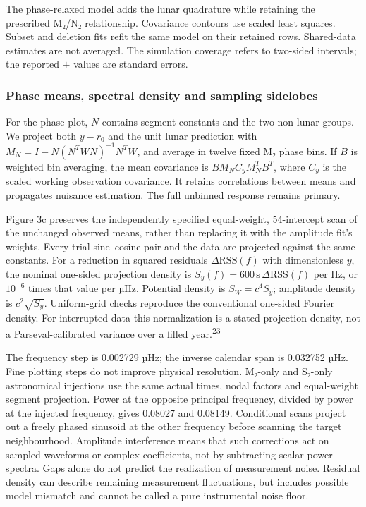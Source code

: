 \documentclass[
  12pt,
  a4paper,
]{article}
\begin{document}
The phase-relaxed model adds the lunar quadrature while retaining the
prescribed M₂/N₂ relationship. Covariance contours use scaled least
squares. Subset and deletion fits refit the same model on their retained
rows. Shared-data estimates are not averaged. The simulation coverage
refers to two-sided intervals; the reported \(\pm\) values are standard
errors.

\hypertarget{phase-means-spectral-density-and-sampling-sidelobes}{%
\subsubsection{Phase means, spectral density and sampling
sidelobes}\label{phase-means-spectral-density-and-sampling-sidelobes}}

For the phase plot, \(N\) contains segment constants and the two
non-lunar groups. We project both \(y-r_0\) and the unit lunar
prediction with \(M_N=I-N(N^TWN)^{-1}N^TW\), and average in twelve fixed
M₂ phase bins. If \(B\) is weighted bin averaging, the mean covariance
is \(BM_NC_yM_N^TB^T\), where \(C_y\) is the scaled working observation
covariance. It retains correlations between means and propagates
nuisance estimation. The full unbinned response remains primary.

Figure 3c preserves the independently specified equal-weight,
54-intercept scan of the unchanged observed means, rather than replacing
it with the amplitude fit's weights. Every trial sine--cosine pair and
the data are projected against the same constants. For a reduction in
squared residuals \(\Delta\mathrm{RSS}(f)\) with dimensionless \(y\),
the nominal one-sided projection density is
\(S_y(f)=600\,\mathrm{s}\,\Delta\mathrm{RSS}(f)\) per Hz, or \(10^{-6}\)
times that value per µHz. Potential density is \(S_W=c^4S_y\); amplitude
density is \(c^2\sqrt{S_y}\). Uniform-grid checks reproduce the
conventional one-sided Fourier density. For interrupted data this
normalization is a stated projection density, not a Parseval-calibrated
variance over a filled year.\textsuperscript{23}

The frequency step is 0.002729 µHz; the inverse calendar span is
0.032752 µHz. Fine plotting steps do not improve physical resolution.
M₂-only and S₂-only astronomical injections use the same actual times,
nodal factors and equal-weight segment projection. Power at the opposite
principal frequency, divided by power at the injected frequency, gives
0.08027 and 0.08149. Conditional scans project out a freely phased
sinusoid at the other frequency before scanning the target
neighbourhood. Amplitude interference means that such corrections act on
sampled waveforms or complex coefficients, not by subtracting scalar
power spectra. Gaps alone do not predict the realization of measurement
noise. Residual density can describe remaining measurement fluctuations,
but includes possible model mismatch and cannot be called a pure
instrumental noise floor.
\end{document}
